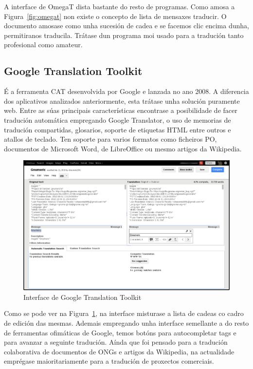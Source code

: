 A interface de OmegaT dista bastante do resto de programas. Como amosa a Figura~\ref{fig:omegat} non existe o concepto de lista de mensaxes traducir. O documento amosase como unha sucesión de cadea e se facemos clic encima dunha, permitiranos traducila. Trátase dun programa moi usado para a tradución tanto profesional como amateur.

\subsection{Google Translation Toolkit}
É a ferramenta CAT desenvolvida por Google e lanzada no ano 2008. A diferencia dos aplicativos analizados anteriormente, esta trátase unha solución puramente web. Entre as súas principais características encontrase a posibilidade de facer tradución automática empregando Google Translator, o uso de memorias de tradución compartidas, glosarios, soporte de etiquetas HTML entre outros e atallos de teclado. Ten soporte para varios formatos como ficheiros PO, documentos de Microsoft Word, de LibreOffice ou mesmo artigos da Wikipedia.

\begin{figure}[h]
    \centering
    \includegraphics[width=\textwidth]{img/captura_googletranslationtoolkit.png}
    \caption{Interface de Google Translation Toolkit}
    \label{fig:translatetoolkit}
\end{figure}

Como se pode ver na Figura~\ref{fig:translatetoolkit}, na interface misturase a lista de cadeas co cadro de edición das mesmas. Ademais empregando unha interface semellante a do resto de ferramentas ofimáticas de Google, temos botóns para autocompletar tags e para avanzar a seguinte tradución. Aínda que foi pensado para a tradución colaborativa de documentos de ONGs e artigos da Wikipedia, na actualidade emprégase maioritariamente para a tradución de proxectos comerciais.


